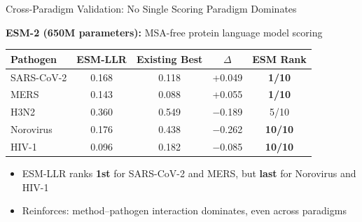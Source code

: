 \documentclass[aspectratio=169,11pt]{beamer}
\begin{document}
\begin{frame}{Cross-Paradigm Validation: No Single Scoring Paradigm Dominates}

\textbf{ESM-2 (650M parameters):} MSA-free protein language model scoring

\begin{center}
\small
\begin{tabular}{lcccc}
\toprule
\textbf{Pathogen} & \textbf{ESM-LLR} & \textbf{Existing Best} & \textbf{$\Delta$} & \textbf{ESM Rank} \\
\midrule
\rowcolor{pahdgreen!12}
SARS-CoV-2 & 0.168 & 0.118 & +0.049 & \textbf{1/10} \\
\rowcolor{pahdgreen!12}
MERS & 0.143 & 0.088 & +0.055 & \textbf{1/10} \\
H3N2 & 0.360 & 0.549 & $-$0.189 & 5/10 \\
\rowcolor{alertred!8}
Norovirus & 0.176 & 0.438 & $-$0.262 & \textbf{10/10} \\
\rowcolor{alertred!8}
HIV-1 & 0.096 & 0.182 & $-$0.085 & \textbf{10/10} \\
\bottomrule
\end{tabular}
\end{center}

\vspace{0.5em}
\begin{itemize}
  \item ESM-LLR ranks \textcolor{pahdgreen}{\textbf{1st}} for SARS-CoV-2 and MERS, but \textcolor{alertred}{\textbf{last}} for Norovirus and HIV-1
  \item Reinforces: method--pathogen interaction dominates, even across paradigms
\end{itemize}
\end{frame}
\end{document}

